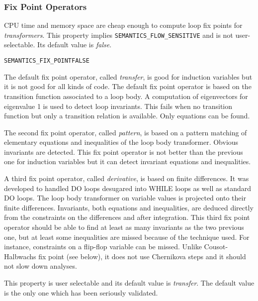 \documentclass[a4paper]{report}
\newenvironment{PipsProp}{\begin{alltt}}{\end{alltt}}
\begin{document}
\subsubsection{Fix Point Operators}

CPU time and memory space are cheap enough to compute loop fix points for
{\em transformers}. This property implies \texttt{SEMANTICS\_FLOW\_SENSITIVE} and is not
user-selectable. Its default value is {\em false}.

\begin{PipsProp}
SEMANTICS_FIX_POINT FALSE
\end{PipsProp}

The default fix point operator, called {\em transfer}, is good for
induction variables but it is not good for all kinds of code. The default
fix point operator is based on the transition function associated to a
loop body. A computation of eigenvectors for eigenvalue 1 is used to
detect loop invariants. This fails when no transition function but only a
transition relation is available. Only equations can be found.

The second fix point operator, called {\em pattern}, is based on a pattern
matching of elementary equations and inequalities of the loop body
transformer. Obvious invariants are detected. This fix point operator is
not better than the previous one for induction variables but it can detect
invariant equations and inequalities.

A third fix point operator, called {\em derivative}, is based on finite
differences. It was developed to handled DO loops desugared into WHILE
loops as well as standard DO loops. The loop body transformer on variable
values is projected onto their finite differences. Invariants, both
equations and inequalities, are deduced directly from the constraints on
the differences and after integration. This third fix point operator
should be able to find at least as many invariants as the two previous
one, but at least some inequalities are missed because of the technique
used. For instance, constraints on a flip-flop variable can be missed.
Unlike Cousot-Halbwachs fix point (see below), it does not use Chernikova
steps and it should not slow down analyses.

This property is user selectable and its default value is {\em transfer}.
The default value is the only one which has been seriously validated.
\end{document}
